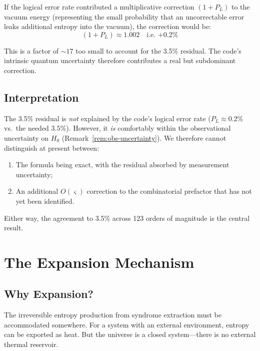 \documentclass[11pt,a4paper]{article}
\theoremstyle{definition}
\newcommand{\gs}{\varsigma}                %
\begin{document}
If the logical error rate contributed a multiplicative correction $(1 + P_L)$ to the vacuum energy (representing the small probability that an uncorrectable error leaks additional entropy into the vacuum), the correction would be:
\begin{equation}
    (1 + P_L) \approx 1.002 \quad \text{i.e.\ $+0.2\%$}
\end{equation}

This is a factor of $\sim\!17$ too small to account for the 3.5\% residual. The code's intrinsic quantum uncertainty therefore contributes a real but subdominant correction.

\subsection{Interpretation}

The 3.5\% residual is \emph{not} explained by the code's logical error rate ($P_L \approx 0.2\%$ vs.\ the needed $3.5\%$). However, it \emph{is} comfortably within the observational uncertainty on $H_0$ (Remark~\ref{rem:obs-uncertainty}). We therefore cannot distinguish at present between:
\begin{enumerate}[nosep]
    \item The formula being exact, with the residual absorbed by measurement uncertainty;
    \item An additional $O(\gs)$ correction to the combinatorial prefactor that has not yet been identified.
\end{enumerate}

Either way, the agreement to 3.5\% across 123 orders of magnitude is the central result.


\section{The Expansion Mechanism}

\subsection{Why Expansion?}

The irreversible entropy production from syndrome extraction must be accommodated somewhere. For a system with an external environment, entropy can be exported as heat. But the universe is a closed system---there is no external thermal reservoir.
\end{document}
